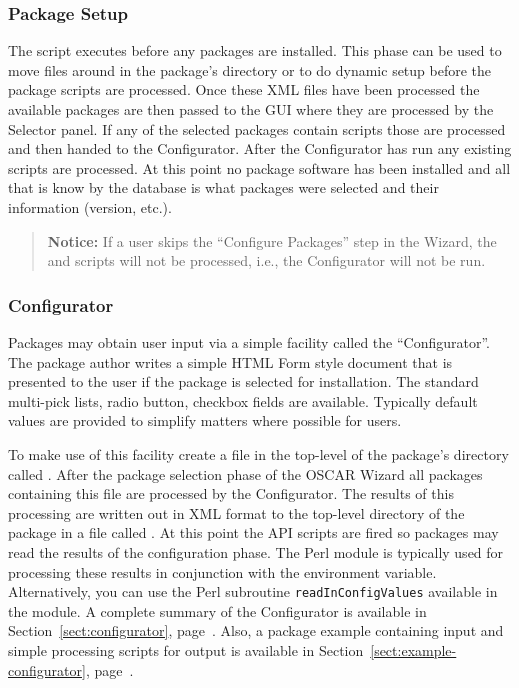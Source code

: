\subsubsection{Package Setup}

The  script executes before any packages are installed.  This
phase can be used to move files around in the package's directory or to do
dynamic setup before the package  scripts are processed.
Once these XML files have been processed the available packages are then
passed to the GUI where they are processed by the Selector panel.  If any
of the selected packages contain  scripts those are
processed and then handed to the Configurator.  After the Configurator has
run any existing  scripts are processed.  At this
point no package software has been installed and all that is know by the
database is what packages were selected and their 
information (version, etc.).

\begin{verse}
   {\bfseries Notice: } If a user skips the ``Configure Packages'' step in
   the Wizard, the  and  scripts
   will not be processed, i.e., the Configurator will not be run. 
\end{verse}




\subsubsection{Configurator}
\label{sect:pkg-configurator}

Packages may obtain user input via a simple facility called the
``Configurator''.  The package author writes a simple HTML Form style
document that is presented to the user if the package is selected for
installation.  The standard multi-pick lists, radio button, checkbox fields
are available.  Typically default values are provided to simplify matters
where possible for users.  

To make use of this facility create a file in the top-level of the
package's directory called .  After the package
selection phase of the OSCAR Wizard all packages containing this file are
processed by the Configurator.  The results of this processing are written
out in XML format to the top-level directory of the package in a file
called .  At this point the
 API scripts are fired so packages may read the
results of the configuration phase.    The Perl  module
is typically used for processing these results in conjunction with the
 environment variable.  Alternatively, you can
use the Perl subroutine \texttt{readInConfigValues} available in the
 module.  A complete summary of the Configurator is
available in Section~\ref{sect:configurator}, page~\pageref{sect:configurator}.
Also, a package example containing input and simple processing scripts for
output is available in Section~\ref{sect:example-configurator},
page~\pageref{sect:example-configurator}.



